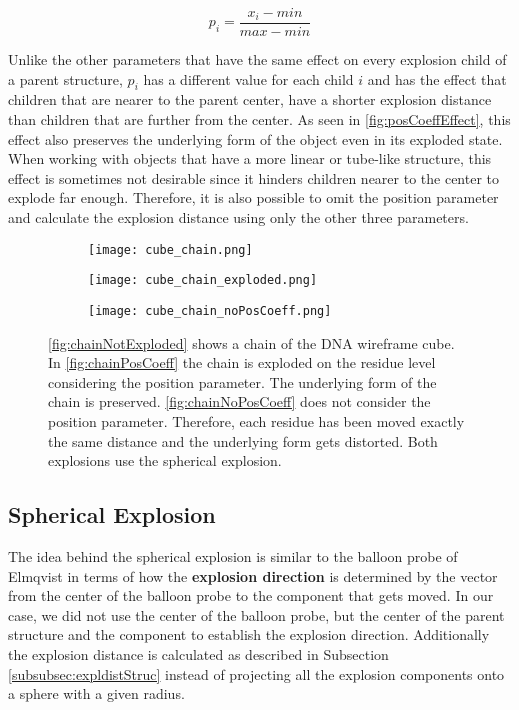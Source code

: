 \documentclass[draft,final]{vutinfth} %
\begin{document}
\begin{equation}
\label{eq:p}
p_i = \frac{x_i - min}{max - min}
\end{equation}

Unlike the other parameters that have the same effect on every explosion child of a parent structure, \(p_i\) has a different value for each child $i$ and has the effect that children that are nearer to the parent center, have a shorter explosion distance than children that are further from the center. As seen in \autoref{fig:posCoeffEffect}, this effect also preserves the underlying form of the object even in its exploded state. When working with objects that have a more linear or tube-like structure, this effect is sometimes not desirable since it hinders children nearer to the center to explode far enough. Therefore, it is also possible to omit the position parameter and calculate the explosion distance using only the other three parameters.

\begin{figure}
\centering
\begin{subfigure}{0.3\textwidth}
  \centering
  \texttt{[image: cube\_chain.png]}
  \caption{}
  \label{fig:chainNotExploded}
\end{subfigure}%
\begin{subfigure}{0.3\textwidth}
  \centering
  \texttt{[image: cube\_chain\_exploded.png]}
  \caption{}
  \label{fig:chainPosCoeff}
\end{subfigure}%
\begin{subfigure}{0.3\textwidth}
  \centering
  \texttt{[image: cube\_chain\_noPosCoeff.png]}
  \caption{}
  \label{fig:chainNoPosCoeff}
\end{subfigure}
\caption{\autoref{fig:chainNotExploded} shows a chain of the DNA wireframe cube. In \autoref{fig:chainPosCoeff} the chain is exploded on the residue level considering the position parameter. The underlying form of the chain is preserved. \autoref{fig:chainNoPosCoeff} does not consider the position parameter. Therefore, each residue has been moved exactly the same distance and the underlying form gets distorted. Both explosions use the spherical explosion.}
\label{fig:posCoeffEffect}
\end{figure}

\subsection{Spherical Explosion}
\label{subsec:methodSphere}
The idea behind the spherical explosion is similar to the balloon probe of Elmqvist \cite{elmqvist2005balloonprobe} in terms of how the \textbf{explosion direction} is determined by the vector from the center of the balloon probe to the component that gets moved. In our case, we did not use the center of the balloon probe, but the center of the parent structure and the component to establish the explosion direction. Additionally the explosion distance is calculated as described in Subsection \ref{subsubsec:expldistStruc} instead of projecting all the explosion components onto a sphere with a given radius.
\end{document}

